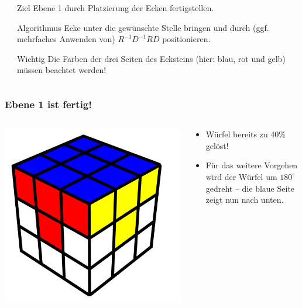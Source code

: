 \begin{frame}
\begin{columns}[c]
\begin{column}[C]{.5\textwidth}
		\end{column}
		\begin{column}[C]{.5\textwidth}
			\begin{block}{Ziel}
				Ebene 1 durch Platzierung der Ecken fertigstellen.
			\end{block}
			\begin{exampleblock}{Algorithmus}
				Ecke \glqq unter\grqq{} die gewünschte Stelle bringen und durch (ggf. mehrfaches Anwenden von) $R^{-1}D^{-1}RD$ positionieren.
			\end{exampleblock}
			\begin{alertblock}{Wichtig}
				Die Farben der drei Seiten des Ecksteins (hier: blau, rot und gelb) müssen beachtet werden!
			\end{alertblock}
		\end{column}
	\end{columns}
	
\end{frame}

\begin{frame}
	\frametitle{Ebene 1 ist fertig!}
	
	\begin{columns}[c]
		\begin{column}[C]{.5\textwidth}
			\center
			\includegraphics[scale=0.3]{img/layer1edge3}
		\end{column}
		\begin{column}[C]{.5\textwidth}
			\begin{itemize}
				\item Würfel bereits zu 40\% gelöst!
				\item Für das weitere Vorgehen wird der Würfel um $180^\circ$ gedreht -- die blaue Seite zeigt nun nach unten.
			\end{itemize}
		\end{column}
	\end{columns}
	
\end{frame}

